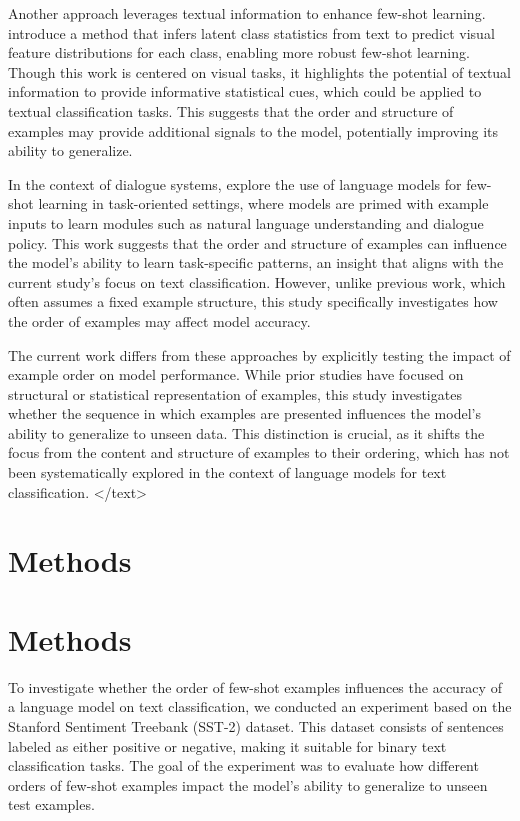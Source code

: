 \documentclass{article}
\begin{document}
Another approach leverages textual information to enhance few-shot learning. \citet{2311.14544v1} introduce a method that infers latent class statistics from text to predict visual feature distributions for each class, enabling more robust few-shot learning. Though this work is centered on visual tasks, it highlights the potential of textual information to provide informative statistical cues, which could be applied to textual classification tasks. This suggests that the order and structure of examples may provide additional signals to the model, potentially improving its ability to generalize.

In the context of dialogue systems, \citet{2008.06239v2} explore the use of language models for few-shot learning in task-oriented settings, where models are primed with example inputs to learn modules such as natural language understanding and dialogue policy. This work suggests that the order and structure of examples can influence the model's ability to learn task-specific patterns, an insight that aligns with the current study's focus on text classification. However, unlike previous work, which often assumes a fixed example structure, this study specifically investigates how the order of examples may affect model accuracy.

The current work differs from these approaches by explicitly testing the impact of example order on model performance. While prior studies have focused on structural or statistical representation of examples, this study investigates whether the sequence in which examples are presented influences the model's ability to generalize to unseen data. This distinction is crucial, as it shifts the focus from the content and structure of examples to their ordering, which has not been systematically explored in the context of language models for text classification.
</text>
\section{Methods}
\section*{Methods}

To investigate whether the order of few-shot examples influences the accuracy of a language model on text classification, we conducted an experiment based on the Stanford Sentiment Treebank (SST-2) dataset. This dataset consists of sentences labeled as either positive or negative, making it suitable for binary text classification tasks. The goal of the experiment was to evaluate how different orders of few-shot examples impact the model's ability to generalize to unseen test examples.
\end{document}
